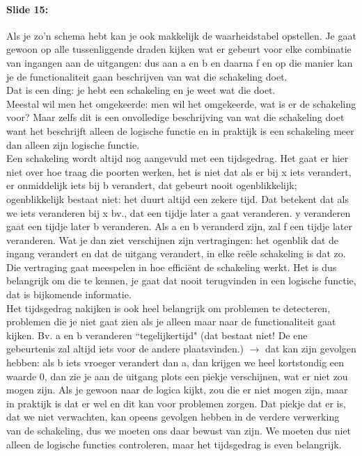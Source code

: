 \documentclass[10pt,a4paper]{book}
\begin{document}
\paragraph{Slide 15:} Als je zo'n schema hebt kan je ook makkelijk de waarheidstabel opstellen. Je gaat gewoon op alle tussenliggende draden kijken wat er gebeurt voor elke combinatie van ingangen aan de uitgangen: dus aan a en b en daarna f en op die manier kan je de functionaliteit gaan beschrijven van wat die schakeling doet. \\
Dat is een ding: je hebt een schakeling en je weet wat die doet. \\
Meestal wil men het omgekeerde: men wil het omgekeerde, wat is er de schakeling voor? Maar zelfs dit is een onvolledige beschrijving van wat die schakeling doet want het beschrijft alleen de logische functie en in praktijk is een schakeling meer dan alleen zijn logische functie. \\
Een schakeling wordt altijd nog aangevuld met een tijdsgedrag. Het gaat er hier niet over hoe traag die poorten werken, het is niet dat als er bij x iets verandert, er onmiddelijk iets bij b verandert, dat gebeurt nooit ogenblikkelijk; ogenblikkelijk bestaat niet: het duurt altijd een zekere tijd. Dat betekent dat als we iets veranderen bij x bv., dat een tijdje later a gaat veranderen. y veranderen gaat een tijdje later b veranderen. Als a en b veranderd zijn, zal f een tijdje later veranderen. Wat je dan ziet verschijnen zijn vertragingen: het ogenblik dat de ingang verandert en dat de uitgang verandert, in elke re\"ele schakeling is dat zo. Die vertraging gaat meespelen in hoe effici\"ent de schakeling werkt. Het is dus belangrijk om die te kennen, je gaat dat nooit terugvinden in een logische functie, dat is bijkomende informatie. \\
Het tijdsgedrag nakijken is ook heel belangrijk om problemen te detecteren, problemen die je niet gaat zien als je alleen maar naar de functionaliteit gaat kijken. Bv. a en b veranderen ``tegelijkertijd" (dat bestaat niet! De ene gebeurtenis zal altijd iets voor de andere plaatsvinden.) $\rightarrow$ dat kan zijn gevolgen hebben: als b iets vroeger verandert dan a, dan krijgen we heel kortstondig een waarde 0, dan zie je aan de uitgang plots een piekje verschijnen, wat er niet zou mogen zijn. Als je gewoon naar de logica kijkt, zou die er niet mogen zijn, maar in praktijk is dat er wel en dit kan voor problemen zorgen. Dat piekje dat er is, dat we niet verwachten, kan opeens gevolgen hebben in de verdere verwerking van de schakeling, dus we moeten ons daar bewust van zijn. We moeten dus niet alleen de logische functies controleren, maar het tijdsgedrag is even belangrijk. 
\end{document}
